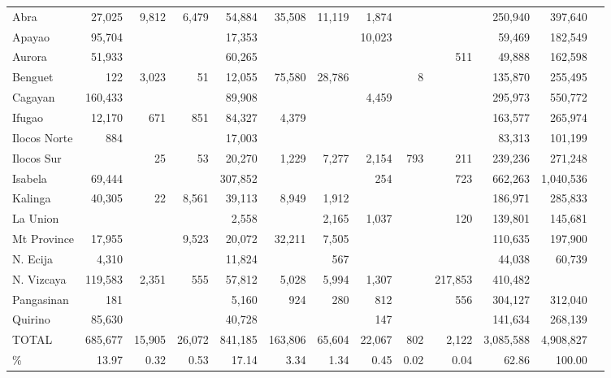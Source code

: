 \begin{appendices}
\begin{landscape}
\begin{spacing}{1.0}
\begin{longtable}[h!]{ @{}lrrrrrrrrrrrr@{} }
    	Abra & 27,025 & 9,812 & 6,479 & 54,884 & 35,508 & 11,119 & 1,874 & {} & {} & 250,940 & 397,640\\
    	Apayao & 95,704 & {} & {} & 17,353 & {} & {} & 10,023 & {} & {} & 59,469 & 182,549\\
    	Aurora & 51,933 & {} & {} & 60,265 & {} & {} & {} & {} & 511 & 49,888 & 162,598\\
    	Benguet & 122 & 3,023 & 51 & 12,055 & 75,580 & 28,786 & {} & 8 & {} & 135,870 & 255,495\\
    	Cagayan & 160,433 & {} & {} & 89,908 & {} & {} & 4,459 & {} & {} & 295,973 & 550,772\\
    	Ifugao & 12,170 & 671 & 851 & 84,327 & 4,379 & {} & {} & {} & {} & 163,577 & 265,974\\
    	Ilocos Norte & 884 & {} & {} & 17,003 & {} & {} & {} & {} & {} & 83,313 & 101,199\\
    	Ilocos Sur & {} & 25 & 53 & 20,270 & 1,229 & 7,277 & 2,154 & 793 & 211 & 239,236 & 271,248\\
    	Isabela & 69,444 & {} & {} & 307,852 & {} & {} & 254 & {} & 723 & 662,263 & 1,040,536\\
    	Kalinga & 40,305 & 22 & 8,561 & 39,113 & 8,949 & 1,912 & {} & {} & {} & 186,971 & 285,833\\
    	La Union & {} & {} & {} & 2,558 & {} & 2,165 & 1,037 & {} & 120 & 139,801 & 145,681\\
    	Mt Province & 17,955 & {} & 9,523 & 20,072 & 32,211 & 7,505 & {} & {} & {} & 110,635 & 197,900\\
    	N. Ecija & 4,310 & {} & {} & 11,824 & {} & 567 & {} & {} & {} & 44,038 & 60,739\\
    	N. Vizcaya & 119,583 & 2,351 & 555 & 57,812 & 5,028 & 5,994 & 1,307 & {}& 217,853 & 410,482\\
    	Pangasinan & 181 & {} & {} & 5,160 & 924 & 280 & 812 & {} & 556 & 304,127 & 312,040\\
    	Quirino & 85,630 & {} & {} & 40,728 & {} & {} & 147 & {} & {} & 141,634 & 268,139\\
    	\cmidrule{1-12}
    	TOTAL & 685,677 & 15,905 & 26,072 & 841,185 & 163,806 & 65,604 & 22,067 & 802 & 2,122 & 3,085,588 & 4,908,827\\
    	\% & 13.97 & 0.32 & 0.53 & 17.14 & 3.34 & 1.34 & 0.45 & 0.02 & 0.04 & 62.86 & 100.00\\
    	\bottomrule
    
\end{longtable}


\end{spacing}
\end{landscape}
\end{appendices}
